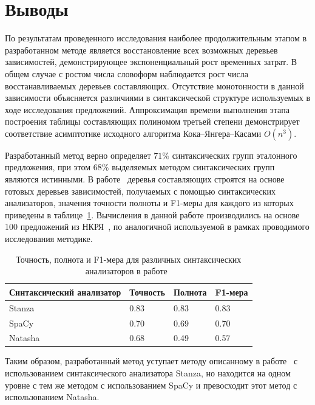 \section*{Выводы}

По результатам проведенного исследования наиболее продолжительным этапом в разработанном методе является восстановление всех возможных деревьев зависимостей, демонстрирующее экспоненциальный рост временных затрат. В общем случае с ростом числа словоформ наблюдается рост числа восстанавливаемых деревьев составляющих. Отсутствие монотонности в данной зависимости объясняется различиями в синтаксической структуре используемых в ходе исследования предложений. Аппроксимация времени выполнения этапа построения таблицы составляющих полиномом третьей степени демонстрирует соответствие асимптотике исходного алгоритма Кока--Янгера--Касами $O(n^3)$.

Разработанный метод верно определяет $71\%$ синтаксических групп эталонного предложения, при этом $68\%$ выделяемых методом синтаксических групп являются истинными. В работе~\cite{Poletaev2023ConstituencyTree} деревья составляющих строятся на основе готовых деревьев зависимостей, получаемых с помощью синтаксических анализаторов, значения точности полноты и F1-меры для каждого из которых приведены в таблице~\ref{tab:poletaev_res}. Вычисления в данной работе производились на основе 100 предложений из НКРЯ~\cite{ruscorpora}, по аналогичной используемой в рамках проводимого исследования методике.

\begin{table}[H]
	\centering
	\caption{Точность, полнота и F1-мера для различных синтаксических анализаторов в работе~\cite{Poletaev2023ConstituencyTree}}
	\begin{tabular}{|p{}|p{}|p{}|p{}|}
		\hline
		Синтаксический анализатор & Точность & Полнота & F1-мера\\\hline
		Stanza~\cite{qi2020stanzapythonnaturallanguage} & 0.83 & 0.83 & 0.83 \\\hline
		SpaCy~\cite{spacy} & 0.70 & 0.69 & 0.70 \\\hline
		Natasha~\cite{natasha} & 0.68 & 0.49 & 0.57 \\\hline
	\end{tabular}
	\label{tab:poletaev_res}
\end{table}

Таким образом, разработанный метод уступает методу описанному в работе~\cite{Poletaev2023ConstituencyTree} с использованием синтаксического анализатора Stanza, но находится на одном уровне с тем же методом с использованием SpaCy и превосходит этот метод с использованием Natasha.
\clearpage